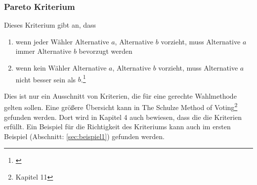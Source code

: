 \newpage
\subsubsection{Pareto Kriterium} 
\label{sec:paretoKriterium}
Dieses Kriterium gibt an, dass
\begin{enumerate}
\item wenn jeder Wähler Alternative $a$, Alternative $b$ vorzieht, muss Alternative $a$ immer Alternative $b$ bevorzugt werden
\item wenn kein Wähler Alternative $a$, Alternative $b$ vorzieht, muss Alternative $a$ nicht besser sein als $b$.\footnote{\Vgl \citet{Schulze2017}}
\end{enumerate}

Dies ist nur ein Ausschnitt von Kriterien, die für eine gerechte Wahlmethode gelten sollen. Eine größere Übersicht kann in \glqq The Schulze Method
of Voting\grqq{}\footnote{\Vgl \citet{Schulze2018} Kapitel 11} gefunden werden. Dort wird in Kapitel 4 auch bewiesen, dass die \schulze die Kriterien erfüllt. Ein Beispiel für die Richtigkeit des \condorcet Kriteriums kann auch im ersten Beispiel (Abschnitt: \ref{sec:beispiel1})  gefunden werden.



